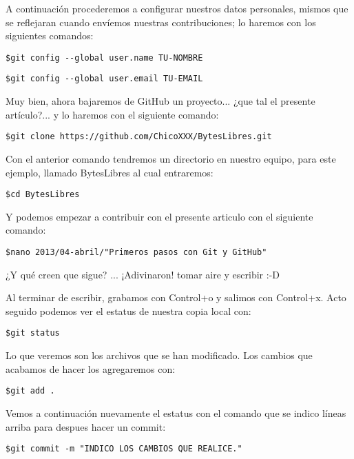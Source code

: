 \documentclass[	DIV=calc,%
							paper=letterpaper,%
							fontsize=13pt,%
							twocolumn]
{article}	 					%
\begin{document}
A continuación procederemos a configurar nuestros datos personales, mismos que se reflejaran cuando envíemos nuestras contribuciones; lo haremos con los siguientes comandos:

\begin{verbatim}
$git config --global user.name TU-NOMBRE
\end{verbatim}

\begin{verbatim}
$git config --global user.email TU-EMAIL
\end{verbatim}

Muy bien, ahora bajaremos de GitHub un proyecto... ¿que tal el presente artículo?... y lo haremos con el siguiente comando:

\begin{verbatim}
$git clone https://github.com/ChicoXXX/BytesLibres.git
\end{verbatim}

Con el anterior comando tendremos un directorio en nuestro equipo, para este ejemplo, llamado BytesLibres al cual entraremos:

\begin{verbatim}
$cd BytesLibres
\end{verbatim}

Y podemos empezar a contribuir con el presente articulo con el siguiente comando:

\begin{verbatim}
$nano 2013/04-abril/"Primeros pasos con Git y GitHub"
\end{verbatim}

¿Y qué creen que sigue? ... ¡Adivinaron! tomar aire y escribir :-D

Al terminar de escribir, grabamos con Control+o y salimos con Control+x. Acto seguido podemos ver el estatus de nuestra copia local con:

\begin{verbatim}
$git status
\end{verbatim}

Lo que veremos son los archivos que se han modificado. Los cambios que acabamos de hacer los agregaremos con:

\begin{verbatim}
$git add .
\end{verbatim}

Vemos a continuación nuevamente el estatus con el comando que se indico líneas arriba para despues hacer un commit:

\begin{verbatim}
$git commit -m "INDICO LOS CAMBIOS QUE REALICE."
\end{verbatim}
\end{document}
